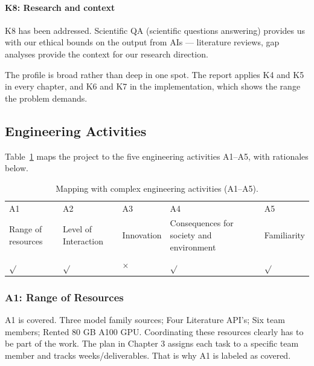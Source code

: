 \paragraph{K8: Research and context} K8 has been addressed. Scientific QA (scientific questions answering) provides us with our ethical bounds on the output from AIs — literature reviews, gap analyses provide the context for our research direction.

The profile is broad rather than deep in one spot. The report applies K4 and K5
in every chapter, and K6 and K7 in the implementation, which shows the range the
problem demands.

\subsection{Engineering Activities}

Table~\ref{tab:e_act} maps the project to the five engineering activities
A1--A5, with rationales below.

\begin{center}
    \begin{table}[ht]
        \centering
        \caption{Mapping with complex engineering activities (A1--A5).}
        \renewcommand{\arraystretch}{1.6}

        \begin{tabular}{|p{}|p{}|p{}|p{}|p{}|}
            \hline
            A1                 & A2                   & A3         & A4                                       & A5          \\
            Range of resources & Level of Interaction & Innovation & Consequences for society and environment & Familiarity \\
            \hline
            $\sqrt{}$          & $\sqrt{}$            & $\times$   & $\sqrt{}$                                 & $\sqrt{}$   \\
            \hline
        \end{tabular}
        \label{tab:e_act}
    \end{table}
\end{center}

\subsubsection{A1: Range of Resources}

A1 is covered. Three model family sources; Four Literature API's; Six team members; Rented 80 GB A100 GPU. Coordinating these resources clearly has to be part of the work. The plan in Chapter 3 assigns each task to a specific team member and tracks weeks/deliverables. That is why A1 is labeled as covered.

